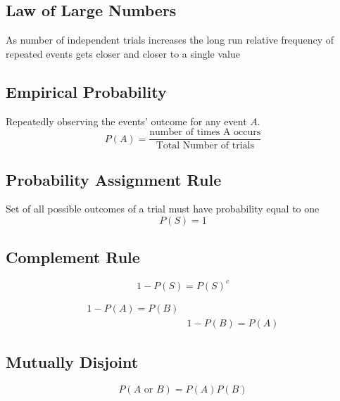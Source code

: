 \documentclass[12pt,a4paper]{article}
\begin{document}
   \subsection*{Law of Large Numbers}
   As number of independent trials increases the long run relative frequency of repeated events gets closer and closer to a single value
   
   \subsection*{Empirical Probability}
   Repeatedly observing the events' outcome for any event      $A$.
     \begin{equation}
         P(A)= \frac{\text{number of times A occurs}}                {\text{Total Number of trials}}
     \end{equation}
     
    \subsection*{Probability Assignment Rule} 
    Set of all possible outcomes of a trial must have           probability equal to one
        \begin{equation}
            P(S)=1
        \end{equation}
        
     \subsection*{Complement Rule}
         \begin{equation}
             1-P(S)=P(S)^c
         \end{equation}
         
         \begin{equation}
    \begin{split}
    1-P(A)=P(B)\\
    &
    1-P(B)=P(A)
    \end{split}
\end{equation}
         
    \subsection*{Mutually Disjoint}
        \begin{equation}
            P(A\text{ or }B) = P(A)P(B)
        \end{equation}
        
\end{document}

